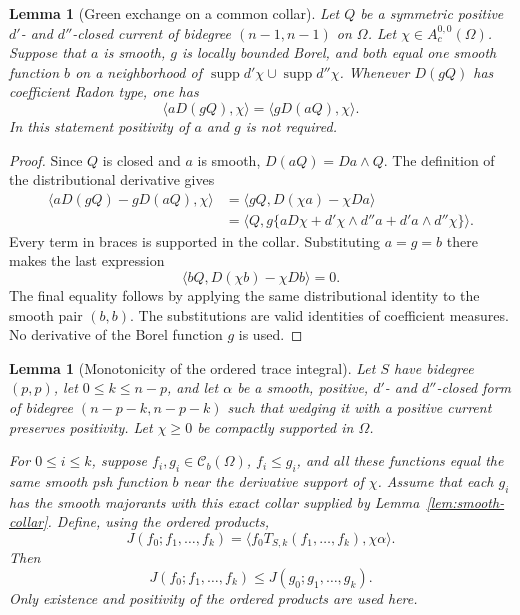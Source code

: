 \documentclass[11pt,a4paper]{article}
\numberwithin{equation}{section}
\newtheorem{lemma}[theorem]{Lemma}
\theoremstyle{definition}
\theoremstyle{remark}
\newcommand{\Cb}{\mathcal C_b}
\begin{document}
\begin{lemma}[Green exchange on a common collar]
\label{lem:collar-green}
Let $Q$ be a symmetric positive $d'$- and $d''$-closed current of
bidegree $(n-1,n-1)$ on $\Omega$. Let $\chi\in A_c^{0,0}(\Omega)$.
Suppose that $a$ is smooth, $g$ is locally bounded Borel, and both equal
one smooth function $b$ on a neighborhood of
$\operatorname{supp}d'\chi\cup\operatorname{supp}d''\chi$.
Whenever $D(gQ)$ has coefficient Radon type, one has
\[
 \langle aD(gQ),\chi\rangle
 =\langle gD(aQ),\chi\rangle.
\]
In this statement positivity of $a$ and $g$ is not required.
\end{lemma}

\begin{proof}
Since $Q$ is closed and $a$ is smooth, $D(aQ)=Da\wedge Q$. The
definition of the distributional derivative gives
\begin{align*}
 \langle aD(gQ)-gD(aQ),\chi\rangle
  &=\langle gQ,D(\chi a)-\chi Da\rangle\\
  &=\langle Q,g\{aD\chi+d'\chi\wedge d''a
                         +d'a\wedge d''\chi\}\rangle.
\end{align*}
Every term in braces is supported in the collar. Substituting $a=g=b$
there makes the last expression
\[
 \langle bQ,D(\chi b)-\chi Db\rangle=0.
\]
The final equality follows by applying the same distributional identity
to the smooth pair $(b,b)$. The substitutions are valid identities of
coefficient measures. No derivative of the Borel function $g$ is used.
\end{proof}

\begin{lemma}[Monotonicity of the ordered trace integral]
\label{lem:trace-monotonicity}
Let $S$ have bidegree $(p,p)$, let $0\leq k\leq n-p$, and let
$\alpha$ be a smooth, positive, $d'$- and $d''$-closed form of bidegree
$(n-p-k,n-p-k)$ such that wedging it with a positive current preserves
positivity. Let $\chi\geq0$ be compactly supported in $\Omega$.

For $0\leq i\leq k$, suppose $f_i,g_i\in\Cb(\Omega)$,
$f_i\leq g_i$, and all these functions equal the same smooth psh
function $b$ near the derivative support of $\chi$. Assume that each
$g_i$ has the smooth majorants with this exact collar supplied by
Lemma~\ref{lem:smooth-collar}. Define, using the ordered products,
\[
 J(f_0;f_1,\ldots,f_k)
   =\langle f_0T_{S,k}(f_1,\ldots,f_k),\chi\alpha\rangle.
\]
Then
\[
 J(f_0;f_1,\ldots,f_k)
 \leq J(g_0;g_1,\ldots,g_k).
\]
Only existence and positivity of the ordered products are used here.
\end{lemma}
\end{document}
